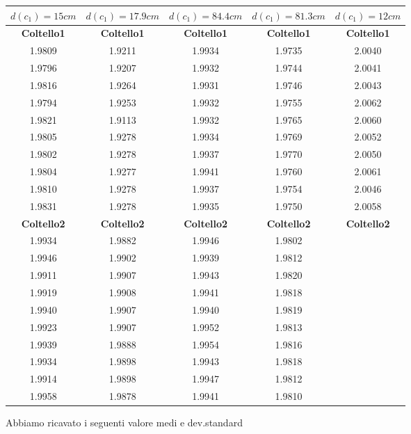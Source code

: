 \documentclass[a4paper,10pt]{report}
\begin{document}
\begin{center}
\begin{tabular}{*{5}{|c}|}
\toprule
\textbf{$d(c_1)=15cm$} & \textbf{$d(c_1)=17.9cm$} & \textbf{$d(c_1)=84.4cm$}& \textbf{$d(c_1)=81.3cm$}& \textbf{$d(c_1)=12cm$}\\
\midrule
 \textbf{Coltello1}&\textbf{Coltello1}&\textbf{Coltello1}&\textbf{Coltello1}&\textbf{Coltello1}\\
 1.9809 & 1.9211 & 1.9934 & 1.9735 & 2.0040\\
 1.9796 & 1.9207 & 1.9932 & 1.9744 & 2.0041\\
 1.9816 & 1.9264 & 1.9931 & 1.9746 & 2.0043\\
 1.9794 & 1.9253 & 1.9932 & 1.9755 & 2.0062\\
 1.9821 & 1.9113 & 1.9932 & 1.9765 & 2.0060\\
 1.9805 & 1.9278 & 1.9934 & 1.9769 & 2.0052\\
 1.9802 & 1.9278 & 1.9937 & 1.9770 & 2.0050\\
 1.9804 & 1.9277 & 1.9941 & 1.9760 & 2.0061\\
 1.9810 & 1.9278 & 1.9937 & 1.9754 & 2.0046\\
 1.9831 & 1.9278 & 1.9935 & 1.9750 & 2.0058\\

 \textbf{Coltello2}&\textbf{Coltello2}&\textbf{Coltello2}&\textbf{Coltello2}&\textbf{Coltello2}\\
 1.9934 & 1.9882 & 1.9946 &	1.9802 & \\
 1.9946 & 1.9902 & 1.9939 &	1.9812 & \\
 1.9911 & 1.9907 & 1.9943 &	1.9820 & \\
 1.9919 & 1.9908 & 1.9941 &	1.9818 & \\
 1.9940 & 1.9907 & 1.9940 &	1.9819 & \\
 1.9923 & 1.9907 & 1.9952 &	1.9813 & \\
 1.9939 & 1.9888 & 1.9954 &	1.9816 & \\
 1.9934 & 1.9898 & 1.9943 &	1.9818 & \\
 1.9914 & 1.9898 & 1.9947 &	1.9812 & \\
 1.9958 & 1.9878 & 1.9941 &	1.9810 & \\
\bottomrule
\end{tabular}
\end{center}

Abbiamo ricavato i seguenti valore medi e dev.standard 
\end{document}
